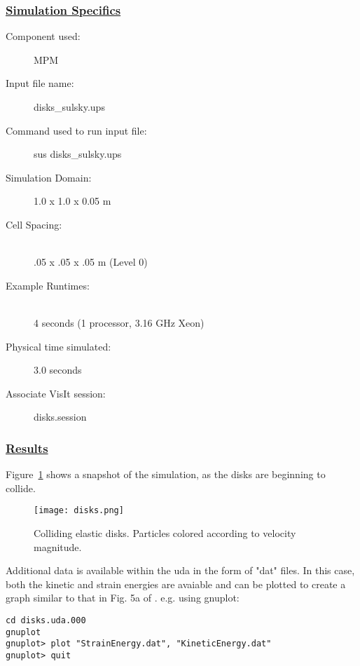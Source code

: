 \subsubsection*{\underline{Simulation Specifics}}
\begin{description} 
\item [Component used:] \hfill MPM
\item [Input file name:] \hfill disks\_sulsky.ups
\item [Command used to run input file:]\hfill sus disks\_sulsky.ups
\item [Simulation Domain:]\hfill    1.0 x 1.0 x 0.05 m

\item [Cell Spacing:]\hfill \\ 
.05 x .05 x .05 m (Level 0)

\item [Example Runtimes:] \hfill \\
 4 seconds  (1 processor, 3.16 GHz Xeon)\\

\item [Physical time simulated:] \hfill 3.0 seconds

\item [Associate VisIt session:] \hfill disks.session

\end{description}

\subsubsection*{\underline{Results}}

Figure~\ref{figdisks} shows a snapshot of the simulation, as the disks
are beginning to collide.
\begin{figure}
  \center
  \texttt{[image: disks.png]}
  \caption{Colliding elastic disks.  Particles colored according to
velocity magnitude.}
  \label{figdisks}
\end{figure}

Additional data is available within the uda in the form of "dat" files.
In this case, both the kinetic and strain energies are avaiable and can
be plotted to create a graph similar to that in Fig. 5a of \cite{sulskycmame}.
e.g. using gnuplot:

\begin{Verbatim}[fontsize=\footnotesize]
cd disks.uda.000
gnuplot
gnuplot> plot "StrainEnergy.dat", "KineticEnergy.dat"
gnuplot> quit
\end{Verbatim}
%
